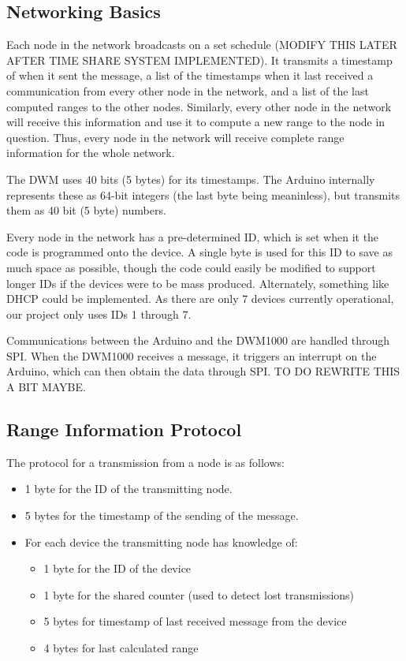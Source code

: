 \subsection{Networking Basics}
Each node in the network broadcasts on a set schedule (MODIFY THIS LATER AFTER TIME SHARE SYSTEM IMPLEMENTED). It transmits a timestamp of when it sent the message, a list of the timestamps when it last received a communication from every other node in the network, and a list of the last computed ranges to the other nodes. Similarly, every other node in the network will receive this information and use it to compute a new range to the node in question. Thus, every node in the network will receive complete range information for the whole network.

The DWM uses 40 bits (5 bytes) for its timestamps. The Arduino internally represents these as 64-bit integers (the last byte being meaninless), but transmits them as 40 bit (5 byte) numbers.

Every node in the network has a pre-determined ID, which is set when it the code is programmed onto the device. A single byte is used for this ID to save as much space as possible, though the code could easily be modified to support longer IDs if the devices were to be mass produced. Alternately, something like DHCP could be implemented. As there are only 7 devices currently operational, our project only uses IDs 1 through 7.

Communications between the Arduino and the DWM1000 are handled through SPI. When the DWM1000 receives a message, it triggers an interrupt on the Arduino, which can then obtain the data through SPI. TO DO REWRITE THIS A BIT MAYBE.

\subsection{Range Information Protocol}
The protocol for a transmission from a node is as follows:

\begin{itemize}
	\item 1 byte for the ID of the transmitting node.
	\item 5 bytes for the timestamp of the sending of the message.
	\item For each device the transmitting node has knowledge of:
	\begin{itemize}
		\item 1 byte for the ID of the device
		\item 1 byte for the shared counter (used to detect lost transmissions)
		\item 5 bytes for timestamp of last received message from the device
		\item 4 bytes for last calculated range	
	\end{itemize} 
\end{itemize}

